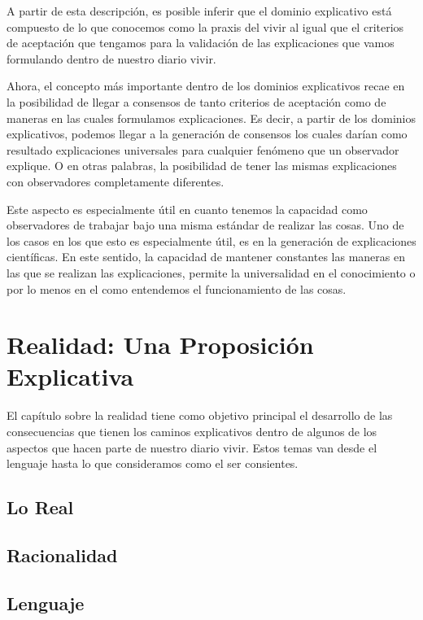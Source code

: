 \documentclass[10pt]{article}
\begin{document}
        A partir de esta descripción, es posible inferir que el dominio explicativo está compuesto de lo que conocemos como la praxis del vivir al igual que el criterios de aceptación que tengamos para la validación de las explicaciones que vamos formulando dentro de nuestro diario vivir.  

        Ahora, el concepto más importante dentro de los dominios explicativos recae en la posibilidad de llegar a consensos de tanto criterios de aceptación como de maneras en las cuales formulamos explicaciones. Es decir, a partir de los dominios explicativos, podemos llegar a la generación de consensos los cuales darían como resultado explicaciones universales para cualquier fenómeno que un observador explique. O en otras palabras, la posibilidad de tener las mismas explicaciones con observadores completamente diferentes.

        Este aspecto es especialmente útil en cuanto tenemos la capacidad como observadores de trabajar bajo una misma estándar de realizar las cosas. Uno de los casos en los que esto es especialmente útil, es en la generación de explicaciones científicas. En este sentido, la capacidad de mantener constantes las maneras en las que se realizan las explicaciones, permite la universalidad en el conocimiento o por lo menos en el como entendemos el funcionamiento de las cosas.

    \section{Realidad: Una Proposición Explicativa}

    El capítulo sobre la realidad tiene como objetivo principal el desarrollo de las consecuencias que tienen los caminos explicativos dentro de algunos de los aspectos que hacen parte de nuestro diario vivir. Estos temas van desde el lenguaje hasta lo que consideramos como el ser consientes.

        \subsection{Lo Real}

        
        
        \subsection{Racionalidad}

        
        
        \subsection{Lenguaje}
\end{document}
